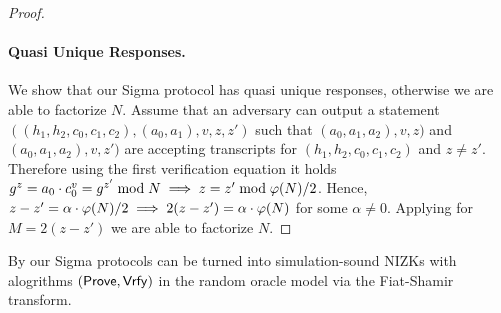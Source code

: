 \begin{proof}
\paragraph{Quasi Unique Responses.} We show that our Sigma protocol has quasi unique responses, otherwise we are able to factorize $N$. Assume that an adversary can output a statement $((h_1, h_2, c_0, c_1, c_2), (a_0, a_1), v, z, z')$ such that $(a_0, a_1, a_2), v, z)$ and $(a_0, a_1, a_2), v, z')$ are accepting transcripts for $(h_1, h_2, c_0, c_1, c_2)$ and $z \neq z'$. Therefore using the first verification equation it holds $g^z = a_0 \cdot c_0^v = g^{z'} \bmod N \implies z = z' \bmod \varphi(N)/2$. Hence, $z-z' = \alpha \cdot \varphi(N)/2 \implies 2(z-z') = \alpha \cdot \varphi(N) $ for some $\alpha \neq 0$. Applying  for $M=2(z-z')$ we are able to factorize $N$.
\end{proof}

By  our Sigma protocols can be turned into simulation-sound NIZKs with alogrithms $(\mathsf{Prove}, \mathsf{Vrfy})$ in the random oracle model via the Fiat-Shamir transform. 




